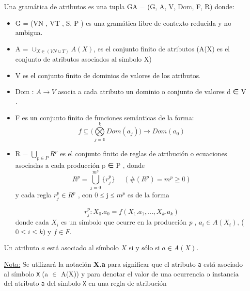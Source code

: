 \begin{definition}
\label{def:grammarattr}
Una gramática de atributos es una tupla GA = (G, A, V, Dom, F, R) donde:
\begin{itemize}
\item G = (VN , VT , S, P ) es una gramática libre de contexto reducida y no ambigua.
\item A = $\cup_{X\in(VN \cup T)} A(X)$, es el conjunto finito de atributos (A(X) es el conjunto de atributos asociados al símbolo X)

\item V es el conjunto finito de dominios de valores de los atributos.
\item Dom : $A\rightarrow V$ asocia a cada atributo un dominio o conjunto de valores d ∈ V .
\item F es un conjunto finito de funciones semánticas de la forma:
\begin{equation}
f \subseteq (\bigotimes\limits_{j=0}^{k}{ Dom(a_{j} ))\rightarrow Dom(a_{0})}
\end{equation}

\item R = $\bigcup _{p∈P} R^{p}$ es el conjunto finito de reglas de atribución o ecuaciones asociadas a cada producción p ∈ P , donde
\begin{equation}
R^{p} = \bigcup\limits_{j=0}^{m^{p}}{\{r_{j}^{p}\}}\ \ \ \ \ \ (\#(R^{p} ) = m^{p} ≥ 0)
\end{equation}
y cada regla $r_{j}^{p} \in R^{p}$ , con 0 ≤ j ≤ $m^{p}$ es de la forma

\begin{equation}
r_{j}^{p}: X_{0}.a_{0} = f(X_{1}.a_{1} ,\dots , X_{k}.a_{k})
\end{equation} 
donde cada $X_{i}$ es un símbolo que ocurre en la producción \textit{p} , $a_{i} \in A(X_{i})$, ($0 \leqslant i \leqslant k$) y $f \in F$.

\end{itemize}
\end{definition}

\begin{definition} Un atributo $a$ está asociado al símbolo $X$ si y sólo si $a \in A(X)$. 
\end{definition}
\underline{Nota:}
Se utilizará la notación \textbf{X.a} para significar que el atributo \texttt{a} está asociado al símbolo \texttt{X} (a $\in$ A(X)) y para denotar el valor de una ocurrencia o instancia del atributo \texttt{a} del símbolo \texttt{X} en una regla de atribución

